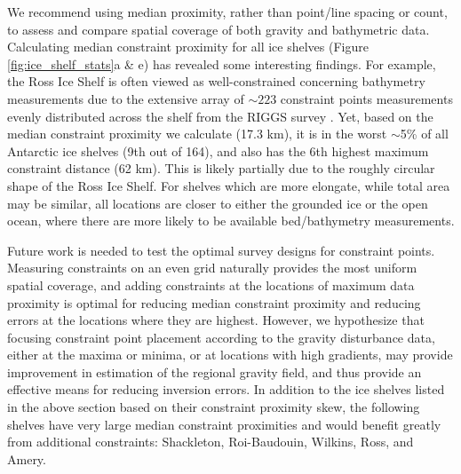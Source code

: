 \documentclass[tc, manuscript]{copernicus}
\begin{document}
We recommend using median proximity, rather than point/line spacing or count, to assess and compare spatial coverage of both gravity and bathymetric data. Calculating median constraint proximity for all ice shelves (Figure \ref{fig:ice_shelf_stats}a \& e) has revealed some interesting findings. For example, the Ross Ice Shelf is often viewed as well-constrained concerning bathymetry measurements due to the extensive array of $\sim223$ constraint points measurements evenly distributed across the shelf from the RIGGS survey \citep{bentleyross1984}. Yet, based on the median constraint proximity we calculate (17.3 km), it is in the worst $\sim$5\% of all Antarctic ice shelves (9th out of 164), and also has the 6th highest maximum constraint distance (62 km). This is likely partially due to the roughly circular shape of the Ross Ice Shelf. For shelves which are more elongate, while total area may be similar, all locations are closer to either the grounded ice or the open ocean, where there are more likely to be available bed/bathymetry measurements.

Future work is needed to test the optimal survey designs for constraint points. Measuring constraints on an even grid naturally provides the most uniform spatial coverage, and adding constraints at the locations of maximum data proximity is optimal for reducing median constraint proximity and reducing errors at the locations where they are highest. However, we hypothesize that focusing constraint point placement according to the gravity disturbance data, either at the maxima or minima, or at locations with high gradients, may provide improvement in estimation of the regional gravity field, and thus provide an effective means for reducing inversion errors. In addition to the ice shelves listed in the above section based on their constraint proximity skew, the following shelves have very large median constraint proximities and would benefit greatly from additional constraints: Shackleton, Roi-Baudouin, Wilkins, Ross, and Amery.
\end{document}
